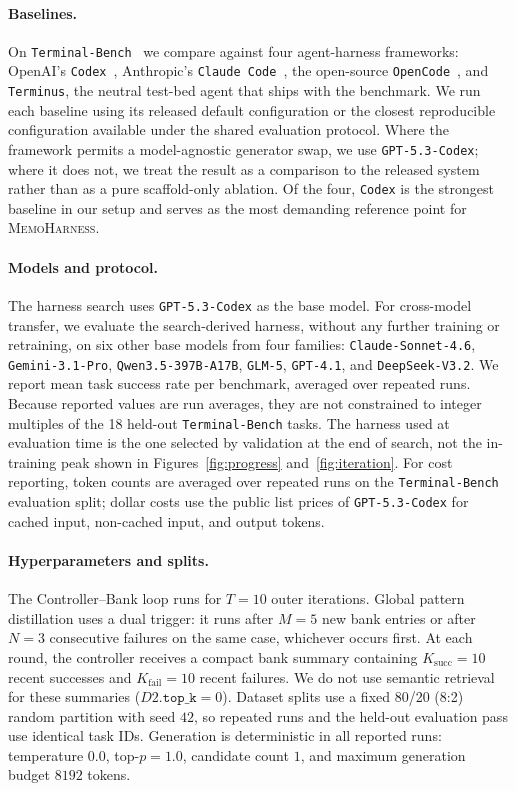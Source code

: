 \documentclass{article}
\newcommand{\method}{\textsc{MemoHarness}\xspace}
\begin{document}
\paragraph{Baselines.}
On \texttt{Terminal-Bench}~\citep{merrill2026terminalbench} we compare
against four agent-harness frameworks: OpenAI's
\texttt{Codex}~\citep{openai2025codexcli}, Anthropic's \texttt{Claude
Code}~\citep{anthropic2025claudecode}, the open-source
\texttt{OpenCode}~\citep{sst2024opencode}, and \texttt{Terminus}, the
neutral test-bed agent that ships with the benchmark. We run each
baseline using its released default configuration or the closest
reproducible configuration available under the shared evaluation
protocol. Where the framework permits a model-agnostic generator swap,
we use \texttt{GPT-5.3-Codex}; where it does not, we treat the result as
a comparison to the released system rather than as a pure scaffold-only
ablation. Of the four,
\texttt{Codex} is the strongest baseline in our setup and serves as
the most demanding reference point for \method.

\paragraph{Models and protocol.}
The harness search uses \texttt{GPT-5.3-Codex} as the base model. For
cross-model transfer, we evaluate the search-derived harness, without
any further training or retraining, on six other base models from four
families: \texttt{Claude-Sonnet-4.6}, \texttt{Gemini-3.1-Pro},
\texttt{Qwen3.5-397B-A17B}, \texttt{GLM-5}, \texttt{GPT-4.1}, and
\texttt{DeepSeek-V3.2}. We report mean task success rate per benchmark,
averaged over repeated runs. Because reported values are run averages,
they are not constrained to integer multiples of the 18 held-out
\texttt{Terminal-Bench} tasks. The harness used at evaluation time is
the one selected by validation at the end of search, not the
in-training peak shown in Figures~\ref{fig:progress}
and~\ref{fig:iteration}. For cost reporting, token counts are averaged
over repeated runs on the \texttt{Terminal-Bench} evaluation split;
dollar costs use the public list prices of \texttt{GPT-5.3-Codex} for
cached input, non-cached input, and output tokens.

\paragraph{Hyperparameters and splits.}
The Controller--Bank loop runs for $T=10$ outer iterations. Global
pattern distillation uses a dual trigger: it runs after $M=5$ new bank
entries or after $N=3$ consecutive failures on the same case, whichever
occurs first. At each round, the controller receives a compact bank
summary containing $K_{\mathrm{succ}}=10$ recent successes and
$K_{\mathrm{fail}}=10$ recent failures. We do not use semantic retrieval
for these summaries ($D2.\texttt{top\_k}=0$). Dataset splits use a fixed
80/20 (8:2) random partition with seed $42$, so repeated runs and the
held-out evaluation pass use identical task IDs. Generation is
deterministic in all reported runs: temperature $0.0$, top-$p=1.0$,
candidate count $1$, and maximum generation budget $8192$ tokens.
\end{document}
